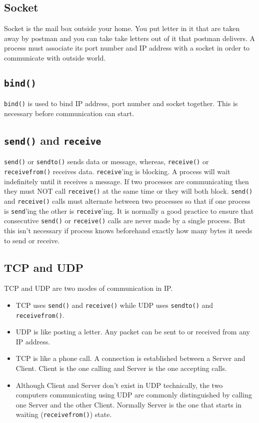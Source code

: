 \documentclass[12pt,a4paper]{article}
\begin{document}
\subsection{Socket}
Socket is the mail box outside your home. You put letter in it that are taken away by postman and you can take take letters out of it that postman delivers. A process must associate its port number and IP address with a socket in order to communicate with outside world.
\subsection{\texttt{bind()}}
\verb|bind()| is used to bind IP address, port number and socket together. This is necessary before communication can start.
\subsection{\texttt{send()} and \texttt{receive}}
\verb|send()| or \verb|sendto()| sends data or message, whereas, \verb|receive()| or \verb|receivefrom()| receives data. \verb|receive|'ing is blocking. A process will wait indefinitely until it receives a message. If two processes are communicating then they must NOT call \verb|receive()| at the same time or they will both block. \verb|send()| and \verb|receive()| calls must alternate between two processes so that if one process is \verb|send|'ing the other is \verb|receive|'ing. It is normally a good practice to ensure that consecutive \verb|send()| or \verb|receive()| calls are never made by a single process. But this isn't necessary if process knows beforehand exactly how many bytes it needs to send or receive.
\subsection{TCP and UDP}
TCP and UDP are two modes of communication in IP.
\begin{itemize}
\item TCP uses \verb|send()| and \verb|receive()| while UDP uses \verb|sendto()| and \verb|receivefrom()|.
\item UDP is like posting a letter. Any packet can be sent to or received from any IP address. 
\item TCP is like a phone call. A connection is established between a Server and Client. Client is the one calling and Server is the one accepting calls.
\item Although Client and Server don't exist in UDP technically, the two computers communicating using UDP are commonly distinguished by calling one Server and the other Client. Normally Server is the one that starts in waiting (\verb|receivefrom()|) state.
\end{itemize}
\end{document}
